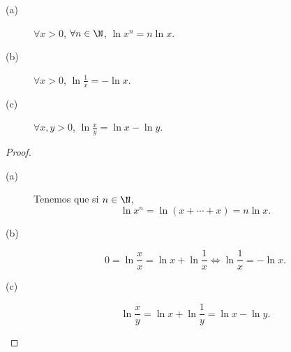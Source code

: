 \begin{fprop}[]
\normalfont 
\begin{description}
\item[(a)] $\displaystyle \forall x > 0 $, $\displaystyle \forall n \in \N $, $\displaystyle \ln x^{n} = n \ln x $.
\item[(b)] $\displaystyle \forall x > 0 $, $\displaystyle \ln \frac{1}{x} = - \ln x $.
\item[(c)] $\displaystyle \forall x,y > 0 $, $\displaystyle \ln \frac{x}{y} = \ln x - \ln y $.
\end{description}
\end{fprop}
\begin{proof}
\begin{description}
\item[(a)] Tenemos que si $\displaystyle n \in \N $, 
	\[ \ln x^{n} = \ln\left(x + \cdots + x\right) = n \ln x .\]
\item[(b)] 
	\[ 0 = \ln \frac{x}{x} = \ln x + \ln\frac{1}{x} \iff \ln \frac{1}{x} = - \ln x.\]
\item[(c)] 
	\[ \ln \frac{x}{y} = \ln x + \ln \frac{1}{y} = \ln x - \ln y .\]
\end{description}
\end{proof}

